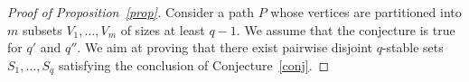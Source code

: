 \documentclass[12pt]{amsart}
\theoremstyle{remark}
\def\red{\color{red}}
\begin{document}
\begin{proof}[Proof of Proposition~\ref{prop}]

Consider a path $P$ whose vertices are partitioned into $m$ subsets $V_1,\ldots,V_m$ of sizes at least $q-1$. We assume that the conjecture is true for $q'$ and $q''$. We aim at proving that there exist pairwise disjoint $q$-stable sets $S_1,\ldots,S_q$ satisfying the conclusion of Conjecture~\ref{conj}. 


\end{proof}
\end{document}
